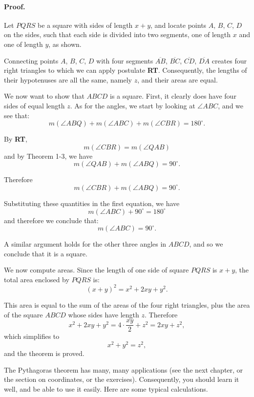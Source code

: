\documentclass[12pt]{book} %
\begin{document}


\paragraph{Proof.}
Let $PQRS$ be a square with sides of length $x+y$, and locate points $A$, $B$, $C$, $D$ on the sides, such that each side is divided into two segments, one of length $x$ and one of length $y$, as shown.


Connecting points $A$, $B$, $C$, $D$ with four segments $\overline{AB}$, $\overline{BC}$, $\overline{CD}$, $\overline{DA}$ creates four right triangles to which we can apply postulate \textbf{RT}. Consequently, the lengths of their hypotenuses are all the same, namely $z$, and their areas are equal.

We now want to show that $ABCD$ is a square. First, it clearly does have four sides of equal length $z$. As for the angles, we start by looking at $\angle ABC$, and we see that:
\[
m(\angle ABQ)+m(\angle ABC)+m(\angle CBR)=180^\circ.
\]

By \textbf{RT},
\[
m(\angle CBR)=m(\angle QAB)
\]
and by Theorem 1-3, we have
\[
m(\angle QAB)+m(\angle ABQ)=90^\circ.
\]

Therefore
\[
m(\angle CBR)+m(\angle ABQ)=90^\circ.
\]

Substituting these quantities in the first equation, we have
\[
m(\angle ABC)+90^\circ=180^\circ
\]
and therefore we conclude that:
\[
m(\angle ABC)=90^\circ.
\]

A similar argument holds for the other three angles in $ABCD$, and so we conclude that it is a square.

We now compute areas. Since the length of one side of square $PQRS$ is $x+y$, the total area enclosed by $PQRS$ is:
\[
(x+y)^2=x^2+2xy+y^2.
\]

This area is equal to the sum of the areas of the four right triangles, plus the area of the square $ABCD$ whose sides have length $z$. Therefore
\[
x^2+2xy+y^2=4\cdot\frac{xy}{2}+z^2=2xy+z^2,
\]
which simplifies to
\[
x^2+y^2=z^2,
\]
and the theorem is proved.

The Pythagoras theorem has many, many applications (see the next chapter, or the section on coordinates, or the exercises). Consequently, you should learn it well, and be able to use it easily. Here are some typical calculations.
\end{document}
